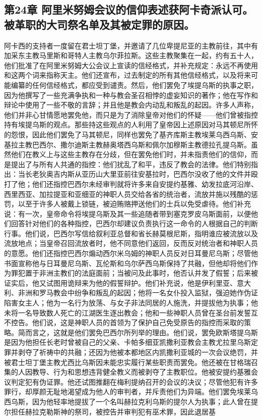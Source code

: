 
\subsection{第24章 阿里米努姆会议的信仰表述获阿卡奇派认可。被革职的大司祭名单及其被定罪的原因。}

阿卡西的支持者一度留在君士坦丁堡，并邀请了几位卑提尼亚的主教前往，其中有加采东主教马里斯和哥特人主教乌尔菲拉斯。这些主教聚集在一起，约有五十人，他们批准了在阿里米努姆大公会议上宣读的信经格式，并补充规定：永远不再使用和这两个词来指称天主。他们还宣布，过去制定的所有其他信经格式，以及将来可能编纂的任何信经格式，都应受到谴责。然后，他们罢免了埃提乌斯的执事之职，因为他撰写了一些充满争执和一种与教会圣召相悖的虚妄知识的著作；他在写作和辩论中使用了一些不敬的言辞；并且他是教会内动乱和叛乱的起因。许多人声称，他们并非心甘情愿地罢免他，而只是为了消除皇帝对他们的怀疑——他们曾被指控持有埃提乌斯的观点。\newline{}那些持这些观点的人利用了皇帝因上述原因对马其顿尼所怀的怨恨，因此他们罢免了马其顿尼，同样也罢免了基齐库斯主教埃莱乌西乌斯、安基拉主教巴西尔、撒尔迪斯主教赫奥塔西乌斯和佩尔加穆斯主教德拉孔提乌斯。虽然他们在教义上与这些主教存在分歧，但在罢免他们时，并未指责他们的信仰，而是提出了与所有人共通的指控：他们扰乱了和平，违反了教会的法律。他们特别指出：当长老狄奥吉内斯从亚历山大里亚前往安基拉时，巴西尔没收了他的文件并殴打了他；他们还指控巴西尔未经审判就将许多来自安提约基雅、幼发拉底河沿岸、西里西亚、加拉提亚和亚细亚的神职人员交给各省的统治者，流放并施以残酷的惩罚，以至于许多人被戴上锁链，被迫贿赂押送他们的士兵以免受虐待。他们补充说：有一次，皇帝命令将埃提乌斯及其一些追随者带到塞克罗皮乌斯面前，以便他们回答针对他们的各种指控，巴西尔却建议负责执行这一命令的人根据自己的判断行事。他们说，巴西尔写信给叙利亚总督和省长赫莫根尼斯，指明谁应被流放以及流放地点；当皇帝召回流放者时，他不同意他们返回，反而反对统治者和神职人员的意愿。他们还指控巴西尔煽动西尔米乌姆的神职人员反对日耳曼尼乌斯；尽管他书面宣称他与日耳曼尼乌斯、瓦伦斯和乌尔萨西乌斯保持了共融，但他却将他们作为罪犯置于非洲主教们的法庭面前；当被问及此事时，他否认并发了假誓；后来被证实后，他又试图用诡辩来为他的假誓辩护。他们补充说，他是伊利里亚、意大利、非洲和罗马教会中纷争和叛乱的起因；他将一名女仆投入监狱，强迫她作伪证陷害女主人；他为一名行为放荡、与女子非法同居的人施洗，并提拔他为执事；他未将一名导致数人死亡的江湖医生逐出教会；他和一些神职人员曾在圣台前发誓互不控告。他们说，这是神职人员的首领为了保护自己免受原告的指控而采取的策略。简而言之，这就是他们罢免巴西尔所列举的理由。他们说，罢免欧斯塔提乌斯是因为他担任长老时曾被自己的父亲、卡帕多细亚凯撒利亚教会主教尤拉里乌斯定罪并剥夺了祈祷中的共融；还因为他被本都地区内凯撒利亚城的一次会议绝罚，并被君士坦丁堡主教尤西比乌斯因未能忠实履行某些职责而罢免。他还被在甘格瑞召集的人因教导、行为和思想违背健全教义而被剥夺了主教职位。他被安提约基雅会议判定犯有伪证罪。他还试图推翻在梅利提纳召开的会议的决议；尽管他犯有许多罪行，却厚颜无耻地渴望成为他人的审判者，并斥责他们为异端。他们罢免埃莱乌西乌斯，因为他轻率地提拔了一个名叫赫拉克利乌斯的提尔人为执事；此人曾在提尔担任赫拉克勒斯神的祭司，被控告并审判犯有巫术罪，因此退居基